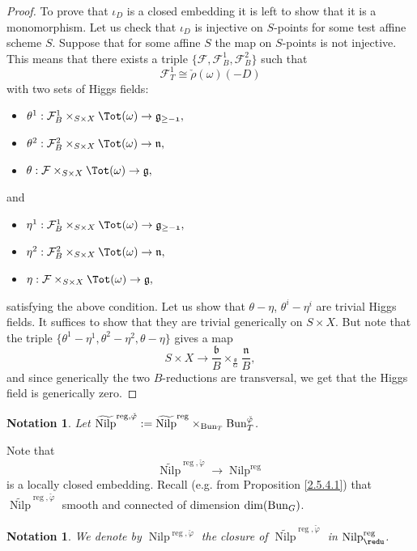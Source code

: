 \documentclass[9pt]{amsart}
\DeclareMathOperator{\reg}{{reg}}
\newcommand{\cF}{{\mathcal F}}
\DeclareMathOperator{\Nilp}{{Nilp}} \DeclareMathOperator{\op}{{op}}
\newtheorem{ntn}[subsubsection]{Notation}
\numberwithin{equation}{section}
\begin{document}
\begin{proof}
	To prove that $\iota_{D}$ is a closed embedding it is left to show that it is a monomorphism. Let us check that $\iota_{D}$ is injective on $S$-points for some test affine scheme $S$. Suppose that for some affine $S$ the map on $S$-points is not injective. This means that there exists a triple $\{ \cF, \cF_B^1, \cF_B^2\}$ such that $$\cF_T^1 \cong \check{\rho}(\omega)(-D)$$ with two sets of Higgs fields:
		\begin{itemize}
		\item$\theta^1: \cF_B^1 \times_{S \times X} \Tot(\omega) \rightarrow \mathfrak{g_{\geq -1}},$
		\item $\theta^2: \cF_B^2 \times_{S \times X}\Tot(\omega) \rightarrow \mathfrak{n},$
		\item $\theta: \cF\times_{S \times X} \Tot(\omega) \rightarrow \mathfrak{g},$
	\end{itemize}
	and 
			\begin{itemize}
			\item$\eta^1: \cF_B^1 \times_{S \times X} \Tot(\omega) \rightarrow \mathfrak{g_{\geq -1}},$
			\item $\eta^2: \cF_B^2 \times_{S \times X} \Tot(\omega) \rightarrow \mathfrak{n},$
			\item $\eta: \cF\times_{S \times X} \Tot(\omega) \rightarrow \mathfrak{g},$
			\end{itemize}
	satisfying the above condition. Let us show that $\theta - \eta$, $\theta^i - \eta^i$ are trivial Higgs fields. It suffices to show that they are trivial generically on $S \times X$. But note that the triple $\{\theta^1 - \eta^1, \theta^2 - \eta^2, \theta - \eta\}$ gives a map 
	$$S \times X \rightarrow \frac{\mathfrak{b}}{B} \times_{\frac{\mathfrak{g}}{G}} \frac{\mathfrak{n}}{B},$$
	and since generically the two $B$-reductions are transversal, we get that the Higgs field is generically zero.
\end{proof} 

\begin{ntn}
	Let $\widetilde{\Nilp}^{\reg, \check{\varphi}}:= \widetilde{\Nilp}^{\reg} \times_{\Bun_T} \Bun_T^{\check{\varphi}}$. 
\end{ntn}
Note that $$\widetilde{\Nilp}^{\reg, \check{\varphi}} \rightarrow \Nilp^{\reg}$$ is a locally closed embedding. 
Recall (e.g. from Proposition \ref{2.5.4.1}) that $\widetilde{\Nilp}^{\reg, \check{\varphi}}$ smooth and connected of dimension $\dim(\operatorname{{Bun}}_G)$.

\begin{ntn}
	We denote by $\Nilp^{\reg, \check{\varphi}}$ the closure of $\widetilde{\Nilp}^{\reg, \check{\varphi}}$ in $\Nilp^{\reg}_{\redu}$.
\end{ntn}
\end{document}
